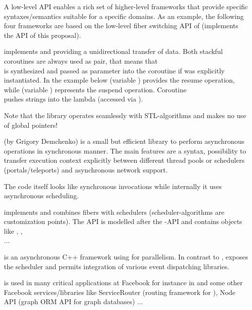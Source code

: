 
A low-level API enables a rich set of higher-level frameworks that provide
specific syntaxes/semantics suitable for a specific domains. As an example, the
following four frameworks are based on the low-level fiber switching API of
\bcontext\cite{bcontext} (implements the API of this proposal).

\uabschnitt{\bcoroutine}\cite{bcoroutine2} implements 
 and  providing a
unidirectional transfer of data. Both stackful coroutines are always used as
pair, that means that\\
 is synthesized and passed as parameter into the
coroutine if  was explicitly instantiated. In the
example below  (variable ) provides the
resume operation, while  (variable )
represents the suspend operation. Coroutine\\
 pushes strings into the lambda (accessed via
).

Note that the library operates seamlessly with STL-algorithms and makes no use
of global pointers!

\uabschnitt{\synca}\cite{synca} (by Grigory Demchenko) is a small but efficient
library to perform asynchronous operations in synchronous manner. The main
features are a  syntax, possibility to transfer execution context
explicitly between different thread pools or schedulers (portals/teleports) and
asynchronous network support.

The code itself looks like synchronous invocations while internally it uses
asynchronous scheduling.

\uabschnitt{\bfiber}\cite{bfiber} implements  and combines
fibers with schedulers (scheduler-algorithms are customization points). The API
is modelled after the -API and contains objects like
, ,\\
 ...

\cite{fbfiber} is an asynchronous C++ framework
using  for parallelism. In contrast to \bfiber,
\fbfibers\xspace exposes the scheduler and permits integration of various
event dispatching libraries.

\fbfibers\xspace is used in many critical applications at Facebook for instance
in \fbmcrouter\cite{fbmcrouter} and some other Facebook services/libraries like
ServiceRouter (routing framework for \fbthrift\cite{fbthrift}), Node API (graph
ORM API for graph databases) ...\\


